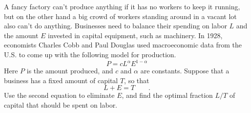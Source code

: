A fancy factory can't produce anything if it has no workers
to keep it running, but on the other hand a big crowd of
workers standing around in a vacant lot also can't do anything.
Businesses need to balance their spending on labor $L$ and
the amount $E$ invested in capital equipment, such as machinery. In 1928, economists
Charles Cobb and Paul Douglas used macroeconomic data from
the U.S. to come up with the following model for production.
\begin{equation*}
  P = cL^\alpha E^{1-\alpha}
\end{equation*}
Here $P$ is the amount produced, and $c$ and $\alpha$ are constants.
Suppose that a business has a fixed amount of capital $T$, so that
\begin{equation*}
  L+E = T \qquad .
\end{equation*}
Use the second equation to eliminate $E$, and find the optimal
fraction $L/T$ of capital that should be spent on labor.
